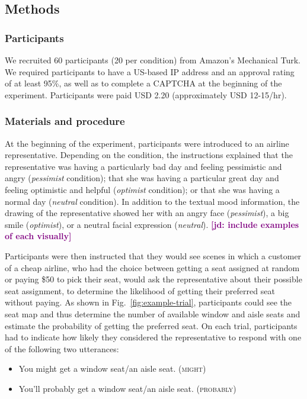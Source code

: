 \documentclass[man,floatsintext]{apa6}
\newcommand{\jd}[1]{\textcolor{Purple}{\bf [jd: #1]}}
\begin{document}
\subsection{Methods}

\subsubsection{Participants} We recruited 60 participants (20 per condition) from Amazon's Mechanical Turk. We required participants to have a US-based IP address and an approval rating of at least 95\%, as well as to complete a CAPTCHA at the beginning of the experiment. Participants were paid USD 2.20 (approximately USD 12-15/hr).

\subsubsection{Materials and procedure}
At the beginning of the experiment, participants were introduced to an airline representative. Depending on the condition, the instructions explained that the representative was having a particularly bad day and feeling pessimistic and angry (\textit{pessimist} condition); that she was having a particular great day and feeling optimistic and helpful (\textit{optimist} condition); or that she was having a normal day (\textit{neutral} condition). In addition to the textual mood information, the drawing of the representative  showed her with an angry face (\textit{pessimist}), a big smile (\textit{optimist}), or a neutral facial expression (\textit{neutral}). \jd{include examples of each visually}

Participants were then instructed that they would see scenes in which a customer of a cheap airline, who had the choice between getting a seat assigned at random or paying \$50 to pick their seat, would ask the representative about their possible seat assignment, to determine the likelihood of getting their preferred seat without paying. As shown in Fig.~\ref{fig:example-trial}, participants could see the seat map and thus determine the number of available window and aisle seats and estimate the probability of getting the preferred seat. On each trial, participants had to indicate how likely they considered the representative to respond with one of the following two  utterances:

\begin{itemize}
    \item You might get a window seat/an aisle seat. (\textsc{might})
    \item You'll probably get a window seat/an aisle seat. (\textsc{probably})
\end{itemize}
\end{document}
